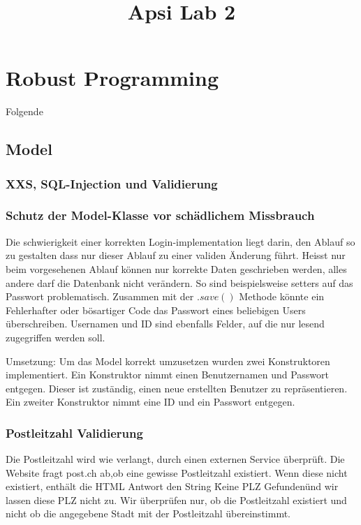 \documentclass[10pt]{scrartcl}
\title{ %
Apsi
\vspace{0.2cm}
\Large Lab 2 }
\begin{document}
 \maketitle
 \thispagestyle{firststyle}
 \pagestyle{firststyle}
 \begin{abstract}
 \begin{center}

 \end{center}
 \vspace{0.5cm}
\hrulefill
\end{abstract}

 \pagestyle{documentstyle}
 \tableofcontents
 \pagebreak
\section{Robust Programming}
Folgende
\subsection{Model}
\subsubsection{XXS, SQL-Injection und Validierung}

\subsubsection{Schutz der Model-Klasse vor schädlichem Missbrauch}
Die schwierigkeit einer korrekten Login-implementation liegt darin, den Ablauf so zu gestalten dass nur dieser Ablauf zu einer validen Änderung führt. Heisst nur beim vorgesehenen Ablauf können nur korrekte Daten geschrieben werden, alles andere darf die Datenbank nicht verändern. So sind beispielsweise setters auf das Passwort problematisch. Zusammen mit der $.save()$ Methode könnte ein Fehlerhafter oder bösartiger Code das Passwort eines beliebigen Users überschreiben. Usernamen und ID sind ebenfalls Felder, auf die nur lesend zugegriffen werden soll.

Umsetzung:
Um das Model korrekt umzusetzen wurden zwei Konstruktoren implementiert. Ein Konstruktor nimmt einen Benutzernamen und Passwort entgegen. Dieser ist zuständig, einen neue erstellten Benutzer zu repräsentieren. Ein zweiter Konstruktor nimmt eine ID und ein Passwort entgegen. 

\subsubsection{Postleitzahl Validierung}
Die Postleitzahl wird wie verlangt, durch einen externen Service überprüft. Die Website fragt post.ch ab,ob eine gewisse Postleitzahl existiert. Wenn diese nicht existiert, enthält die HTML Antwort den String \"Keine PLZ Gefunden\" und wir lassen diese PLZ nicht zu. Wir überprüfen nur, ob die Postleitzahl existiert und nicht ob die angegebene Stadt mit der Postleitzahl übereinstimmt. 
\end{document}
